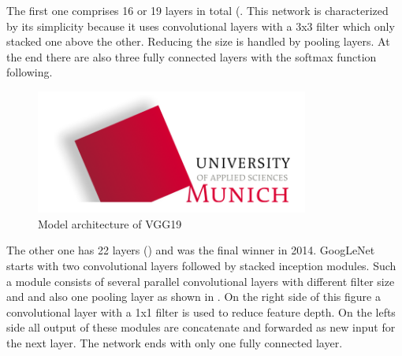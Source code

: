 The first one comprises 16 or 19 layers in total (. This network is characterized by its simplicity because it uses convolutional layers with a 3x3 filter which only stacked one above the other. Reducing the size is handled by pooling layers. At the end there are also three fully connected layers with the softmax function following.

\begin{figure}[htbp]
\includegraphics[width=0.8\textwidth]{includes/MUASlogo}
\caption[Model architecture of VGG19]{Model architecture of VGG19 \citep{He2016}}
\label{fig:FH-Logo3}
\end{figure}

The other one has 22 layers () and was the final winner in 2014. GoogLeNet starts with two convolutional layers followed by stacked inception modules. Such a module consists of several parallel convolutional layers with different filter size and and also one pooling layer as shown in . On the right side of this figure a convolutional layer with a 1x1 filter is used to reduce feature depth. On the lefts side all output of these modules are concatenate and forwarded as new input for the next layer. The network ends with only one fully connected layer.

